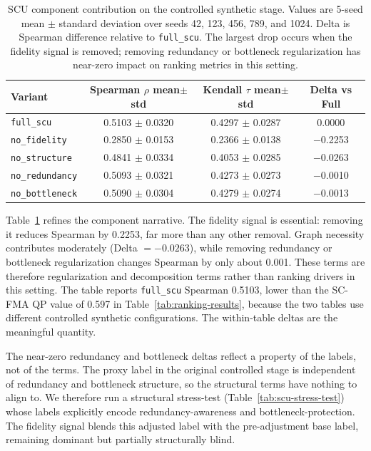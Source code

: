 \documentclass[a4paper,fleqn]{cas-sc}
\begin{document}
\begin{table}[ht]
\caption{SCU component contribution on the controlled synthetic stage. Values are 5-seed mean $\pm$ standard deviation over seeds 42, 123, 456, 789, and 1024. Delta is Spearman difference relative to \texttt{full\_scu}. The largest drop occurs when the fidelity signal is removed; removing redundancy or bottleneck regularization has near-zero impact on ranking metrics in this setting.}
\label{tab:scu-component-contribution}
\centering
\small
\renewcommand{\arraystretch}{1.08}
\begin{tabular}{lccc}
\toprule
\textbf{Variant} & \textbf{Spearman $\rho$ mean$\pm$std} & \textbf{Kendall $\tau$ mean$\pm$std} & \textbf{Delta vs Full} \\
\midrule
\texttt{full\_scu} & 0.5103 $\pm$ 0.0320 & 0.4297 $\pm$ 0.0287 & 0.0000 \\
\texttt{no\_fidelity} & 0.2850 $\pm$ 0.0153 & 0.2366 $\pm$ 0.0138 & $-$0.2253 \\
\texttt{no\_structure} & 0.4841 $\pm$ 0.0334 & 0.4053 $\pm$ 0.0285 & $-$0.0263 \\
\texttt{no\_redundancy} & 0.5093 $\pm$ 0.0321 & 0.4273 $\pm$ 0.0273 & $-$0.0010 \\
\texttt{no\_bottleneck} & 0.5090 $\pm$ 0.0304 & 0.4279 $\pm$ 0.0274 & $-$0.0013 \\
\bottomrule
\end{tabular}
\end{table}

Table~\ref{tab:scu-component-contribution} refines the component narrative. The fidelity signal is essential: removing it reduces Spearman by 0.2253, far more than any other removal. Graph necessity contributes moderately (Delta $=-0.0263$), while removing redundancy or bottleneck regularization changes Spearman by only about 0.001. These terms are therefore regularization and decomposition terms rather than ranking drivers in this setting. The table reports \texttt{full\_scu} Spearman 0.5103, lower than the SC-FMA QP value of 0.597 in Table~\ref{tab:ranking-results}, because the two tables use different controlled synthetic configurations. The within-table deltas are the meaningful quantity.

The near-zero redundancy and bottleneck deltas reflect a property of the labels, not of the terms. The proxy label in the original controlled stage is independent of redundancy and bottleneck structure, so the structural terms have nothing to align to. We therefore run a structural stress-test (Table~\ref{tab:scu-stress-test}) whose labels explicitly encode redundancy-awareness and bottleneck-protection. The fidelity signal blends this adjusted label with the pre-adjustment base label, remaining dominant but partially structurally blind.
\end{document}
